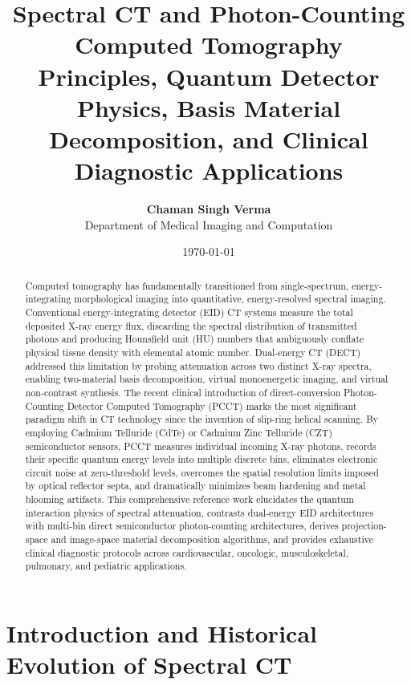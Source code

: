 \documentclass[11pt,a4paper]{article}
\title{\textbf{\huge Spectral CT and Photon-Counting Computed Tomography}\\[0.4em]
\Large Principles, Quantum Detector Physics, Basis Material Decomposition, and Clinical Diagnostic Applications}
\author{\textbf{Chaman Singh Verma} \\
\small Department of Medical Imaging and Computation}
\date{\today}
\begin{document}
\maketitle

\begin{abstract}
Computed tomography has fundamentally transitioned from single-spectrum, energy-integrating morphological imaging into quantitative, energy-resolved spectral imaging. Conventional energy-integrating detector (EID) CT systems measure the total deposited X-ray energy flux, discarding the spectral distribution of transmitted photons and producing Hounsfield unit (HU) numbers that ambiguously conflate physical tissue density with elemental atomic number. Dual-energy CT (DECT) addressed this limitation by probing attenuation across two distinct X-ray spectra, enabling two-material basis decomposition, virtual monoenergetic imaging, and virtual non-contrast synthesis. The recent clinical introduction of direct-conversion Photon-Counting Detector Computed Tomography (PCCT) marks the most significant paradigm shift in CT technology since the invention of slip-ring helical scanning. By employing Cadmium Telluride (CdTe) or Cadmium Zinc Telluride (CZT) semiconductor sensors, PCCT measures individual incoming X-ray photons, records their specific quantum energy levels into multiple discrete bins, eliminates electronic circuit noise at zero-threshold levels, overcomes the spatial resolution limits imposed by optical reflector septa, and dramatically minimizes beam hardening and metal blooming artifacts. This comprehensive reference work elucidates the quantum interaction physics of spectral attenuation, contrasts dual-energy EID architectures with multi-bin direct semiconductor photon-counting architectures, derives projection-space and image-space material decomposition algorithms, and provides exhaustive clinical diagnostic protocols across cardiovascular, oncologic, musculoskeletal, pulmonary, and pediatric applications.
\end{abstract}

\tableofcontents
\newpage

\section{Introduction and Historical Evolution of Spectral CT}
\end{document}
